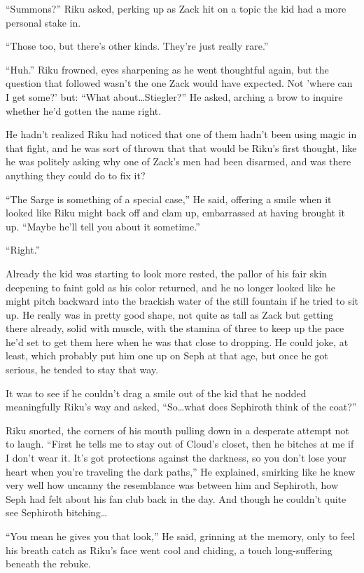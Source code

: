 ``Summons?'' Riku asked, perking up as Zack hit on a topic the kid had a more personal stake in.

``Those too, but there's other kinds. They're just really rare.''

``Huh.'' Riku frowned, eyes sharpening as he went thoughtful again, but the question that followed wasn't the one Zack would have expected. Not 'where can I get some?' but: ``What about\ldots Stiegler?'' He asked, arching a brow to inquire whether he'd gotten the name right.

He hadn't realized Riku had noticed that one of them hadn't been using magic in that fight, and he was sort of thrown that that would be Riku's first thought, like he was politely asking why one of Zack's men had been disarmed, and was there anything they could do to fix it?

``The Sarge is something of a special case,'' He said, offering a smile when it looked like Riku might back off and clam up, embarrassed at having brought it up. ``Maybe he'll tell you about it sometime.''

``Right.''

Already the kid was starting to look more rested, the pallor of his fair skin deepening to faint gold as his color returned, and he no longer looked like he might pitch backward into the brackish water of the still fountain if he tried to sit up. He really was in pretty good shape, not quite as tall as Zack but getting there already, solid with muscle, with the stamina of three to keep up the pace he'd set to get them here when he was that close to dropping. He could joke, at least, which probably put him one up on Seph at that age, but once he got serious, he tended to stay that way.

It was to see if he couldn't drag a smile out of the kid that he nodded meaningfully Riku's way and asked, ``So\ldots what does Sephiroth think of the coat?''

Riku snorted, the corners of his mouth pulling down in a desperate attempt not to laugh. ``First he tells me to stay out of Cloud's closet, then he bitches at me if I don't wear it. It's got protections against the darkness, so you don't lose your heart when you're traveling the dark paths,'' He explained, smirking like he knew very well how uncanny the resemblance was between him and Sephiroth, how Seph had felt about his fan club back in the day. And though he couldn't quite see Sephiroth bitching\ldots

``You mean he gives you that look,'' He said, grinning at the memory, only to feel his breath catch as Riku's face went cool and chiding, a touch long-suffering beneath the rebuke.

